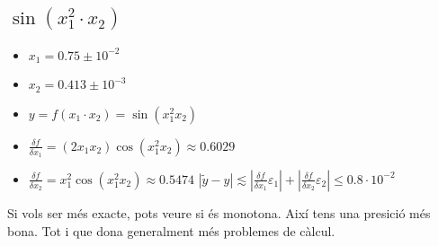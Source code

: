\documentclass{article}
\begin{document}
\subsection{$\sin(x^2_1 \cdot x_2)$}
\begin{itemize}
	\item $x_1 = 0.75 \pm 10^{-2}$
	\item $x_2 = 0.413\pm 10^{-3}$
	\item $y = f(x_1 \cdot x_2) = \sin (x_1^2 x_2)$
	\item $\frac{\delta f}{\delta x_1} = (2 x_1 x_2)\cos(x_1^2x_2) \approx 0.6029$
	\item $\frac{\delta f}{\delta x_2} = x_1^2 \cos(x_1^2x_2) \approx 0.5474$
		\subitem $|\tilde y - y| \lesssim |\frac{\delta f}{\delta x_1} \varepsilon_1| + |\frac{\delta f}{\delta x_2} \varepsilon_2|
			\le 0.8 \cdot 10^{-2}$
\end{itemize}
Si vols ser més exacte, pots veure si és monotona. Així tens una presició més bona. Tot i que dona generalment més problemes de càlcul.
\end{document}
